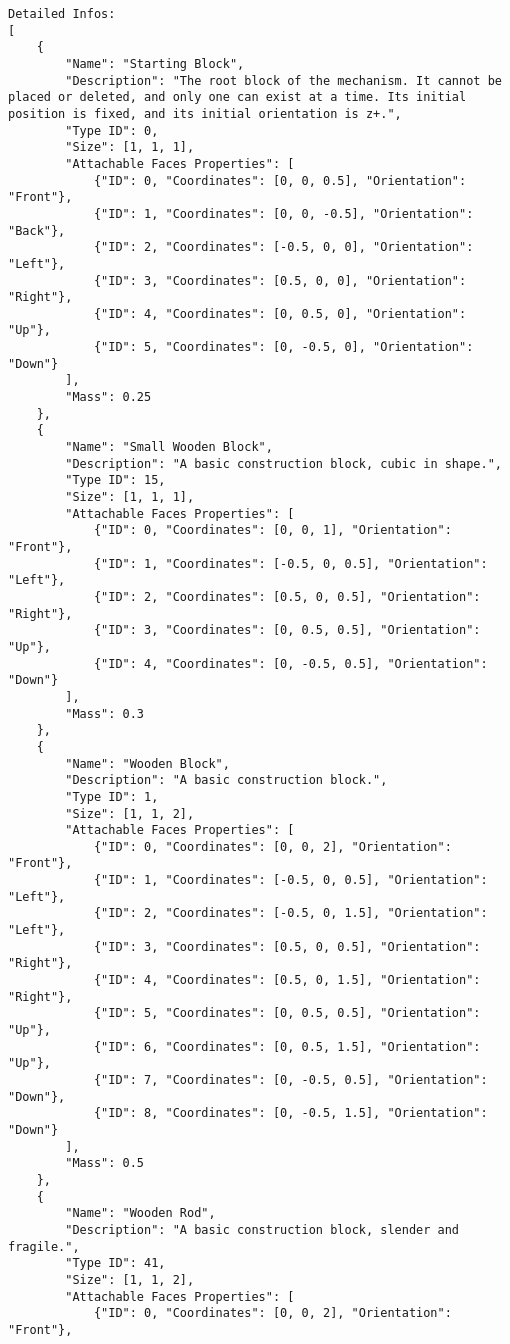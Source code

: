 \begin{lstlisting}
Detailed Infos:
[
    {
        "Name": "Starting Block",
        "Description": "The root block of the mechanism. It cannot be placed or deleted, and only one can exist at a time. Its initial position is fixed, and its initial orientation is z+.",
        "Type ID": 0,
        "Size": [1, 1, 1],
        "Attachable Faces Properties": [
            {"ID": 0, "Coordinates": [0, 0, 0.5], "Orientation": "Front"},
            {"ID": 1, "Coordinates": [0, 0, -0.5], "Orientation": "Back"},
            {"ID": 2, "Coordinates": [-0.5, 0, 0], "Orientation": "Left"},
            {"ID": 3, "Coordinates": [0.5, 0, 0], "Orientation": "Right"},
            {"ID": 4, "Coordinates": [0, 0.5, 0], "Orientation": "Up"},
            {"ID": 5, "Coordinates": [0, -0.5, 0], "Orientation": "Down"}
        ],
        "Mass": 0.25
    },
    {
        "Name": "Small Wooden Block",
        "Description": "A basic construction block, cubic in shape.",
        "Type ID": 15,
        "Size": [1, 1, 1],
        "Attachable Faces Properties": [
            {"ID": 0, "Coordinates": [0, 0, 1], "Orientation": "Front"},
            {"ID": 1, "Coordinates": [-0.5, 0, 0.5], "Orientation": "Left"},
            {"ID": 2, "Coordinates": [0.5, 0, 0.5], "Orientation": "Right"},
            {"ID": 3, "Coordinates": [0, 0.5, 0.5], "Orientation": "Up"},
            {"ID": 4, "Coordinates": [0, -0.5, 0.5], "Orientation": "Down"}
        ],
        "Mass": 0.3
    },
    {
        "Name": "Wooden Block",
        "Description": "A basic construction block.",
        "Type ID": 1,
        "Size": [1, 1, 2],
        "Attachable Faces Properties": [
            {"ID": 0, "Coordinates": [0, 0, 2], "Orientation": "Front"},
            {"ID": 1, "Coordinates": [-0.5, 0, 0.5], "Orientation": "Left"},
            {"ID": 2, "Coordinates": [-0.5, 0, 1.5], "Orientation": "Left"},
            {"ID": 3, "Coordinates": [0.5, 0, 0.5], "Orientation": "Right"},
            {"ID": 4, "Coordinates": [0.5, 0, 1.5], "Orientation": "Right"},
            {"ID": 5, "Coordinates": [0, 0.5, 0.5], "Orientation": "Up"},
            {"ID": 6, "Coordinates": [0, 0.5, 1.5], "Orientation": "Up"},
            {"ID": 7, "Coordinates": [0, -0.5, 0.5], "Orientation": "Down"},
            {"ID": 8, "Coordinates": [0, -0.5, 1.5], "Orientation": "Down"}
        ],
        "Mass": 0.5
    },
    {
        "Name": "Wooden Rod",
        "Description": "A basic construction block, slender and fragile.",
        "Type ID": 41,
        "Size": [1, 1, 2],
        "Attachable Faces Properties": [
            {"ID": 0, "Coordinates": [0, 0, 2], "Orientation": "Front"},

\end{lstlisting}
